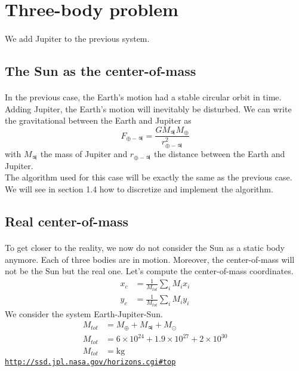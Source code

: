 \documentclass[a4paper, twoside, 11pt]{report}
\theoremstyle{theorem}
\theoremstyle{remark}
\theoremstyle{exemple}
\begin{document}
                        
    
    \section{Three-body problem}
        \paragraph{}We add Jupiter to the previous system.
        
        \subsection{The Sun as the center-of-mass}
            \paragraph{}In the previous case, the Earth's motion had a stable circular orbit in time. Adding Jupiter, the Earth's motion will inevitably be disturbed. We can write the gravitational between the Earth and Jupiter as 
                \begin{equation*}
                    F_{\oplus-\jupiter} = \frac{GM_{\jupiter}M_{\oplus}}{r_{\oplus-\jupiter}^2} 
                \end{equation*}
            with $M_{\jupiter}$ the mass of Jupiter and $r_{\oplus - \jupiter}$ the distance between the Earth and Jupiter. \\
            The algorithm used for this case will be exactly the same as the previous case. We will see in section 1.4 how to discretize and implement the algorithm. 
            
        \subsection{Real center-of-mass}
            \paragraph{}To get closer to the reality, we now do not consider the Sun as a static body anymore. Each of three bodies are in motion. Moreover, the center-of-mass will not be the Sun but the real one. Let's compute the center-of-mass coordinates.
                \begin{align*}
                    x_c &= \frac{1}{M_{tot}}\sum\limits_{i} M_i x_i\\
                    y_c &= \frac{1}{M_{tot}}\sum\limits_{i} M_i y_i
                \end{align*}
            We consider the system Earth-Jupiter-Sun.
                \begin{align*}
                    M_{tot} &= M_{\oplus} + M_{\jupiter} + M_{\odot} \\
                    M_{tot} &= 6\times10^{24} + 1.9\times 10^{27} + 2 \times 10^{30}\\
                    M_{tot} &= \mathrm{kg}
                \end{align*}
    \href{{http://ssd.jpl.nasa.gov/horizons.cgi#top}}{\nolinkurl{http://ssd.jpl.nasa.gov/horizons.cgi\#top}}
\end{document}
